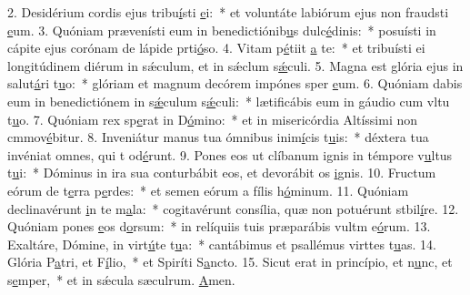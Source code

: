 2. Desidérium cordis ejus tribu\uline{í}sti \uline{e}i:~* et voluntáte labiórum ejus non fraudsti \uline{e}um.
3. Quóniam prævenísti eum in benedictiónib\uline{u}s dulc\uline{é}dinis:~* posuísti in cápite ejus corónam de lápide prti\uline{ó}so.
4. Vitam p\uline{é}tiit \uline{a} te:~* et tribuísti ei longitúdinem diérum in sǽculum, et in sǽclum s\uline{ǽ}culi.
5. Magna est glória ejus in salut\uline{á}ri t\uline{u}o:~* glóriam et magnum decórem impónes sper \uline{e}um.
6. Quóniam dabis eum in benedictiónem in s\uline{ǽ}culum s\uline{ǽ}culi:~* lætificábis eum in gáudio cum vltu t\uline{u}o.
7. Quóniam rex sp\uline{e}rat in D\uline{ó}mino:~* et in misericórdia Altíssimi non cmmov\uline{é}bitur.
8. Inveniátur manus tua ómnibus inim\uline{í}cis t\uline{u}is:~* déxtera tua invéniat omnes, qui t od\uline{é}runt.
9. Pones eos ut clíbanum ignis in témpore v\uline{u}ltus t\uline{u}i:~* Dóminus in ira sua conturbábit eos, et devorábit os \uline{i}gnis.
10. Fructum eórum de t\uline{e}rra p\uline{e}rdes:~* et semen eórum a fílis h\uline{ó}minum.
11. Quóniam declinavérunt \uline{i}n te m\uline{a}la:~* cogitavérunt consília, quæ non potuérunt stbil\uline{í}re.
12. Quóniam pones \uline{e}os d\uline{o}rsum:~* in relíquiis tuis præparábis vultm e\uline{ó}rum.
13. Exaltáre, Dómine, in virt\uline{ú}te t\uline{u}a:~* cantábimus et psallémus virttes t\uline{u}as.
14. Glória P\uline{a}tri, et F\uline{í}lio,~* et Spiríti S\uline{a}ncto.
15. Sicut erat in princípio, et n\uline{u}nc, et s\uline{e}mper,~* et in sǽcula sæculrum. \uline{A}men.
